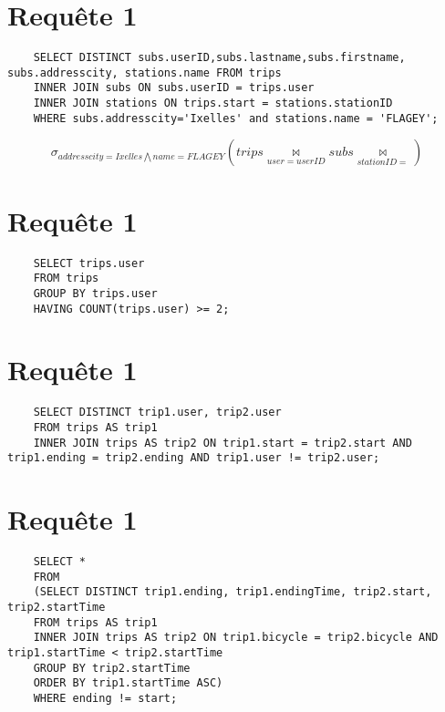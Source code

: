\documentclass[a4paper,11pt]{article}
\DeclareMathOperator*{\join}{\bowtie}
\begin{document}
\section{Requ\^ete 1}
    \begin{lstlisting}
    SELECT DISTINCT subs.userID,subs.lastname,subs.firstname, subs.addresscity, stations.name FROM trips 
    INNER JOIN subs ON subs.userID = trips.user
    INNER JOIN stations ON trips.start = stations.stationID
    WHERE subs.addresscity='Ixelles' and stations.name = 'FLAGEY';
    \end{lstlisting}

    \begin{displaymath}
    \sigma_{addresscity=Ixelles \bigwedge name=FLAGEY}(trips \join\limits_{user=userID}^{} subs \join\limits_{stationID=})
    \end{displaymath}

\section{Requ\^ete 1}
    \begin{lstlisting}
    SELECT trips.user
    FROM trips
    GROUP BY trips.user
    HAVING COUNT(trips.user) >= 2;
    \end{lstlisting}


\section{Requ\^ete 1}
    \begin{lstlisting}
    SELECT DISTINCT trip1.user, trip2.user
    FROM trips AS trip1
    INNER JOIN trips AS trip2 ON trip1.start = trip2.start AND trip1.ending = trip2.ending AND trip1.user != trip2.user;
    \end{lstlisting}


\section{Requ\^ete 1}
    \begin{lstlisting}
    SELECT *
    FROM
    (SELECT DISTINCT trip1.ending, trip1.endingTime, trip2.start, trip2.startTime
    FROM trips AS trip1
    INNER JOIN trips AS trip2 ON trip1.bicycle = trip2.bicycle AND trip1.startTime < trip2.startTime
    GROUP BY trip2.startTime
    ORDER BY trip1.startTime ASC)
    WHERE ending != start;
    \end{lstlisting}
\end{document}
